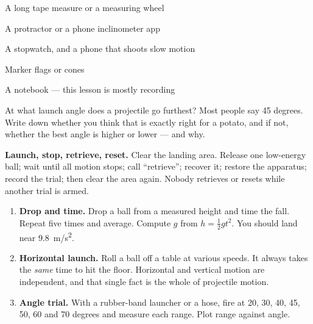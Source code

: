 



\begin{materials}
\item A long tape measure or a measuring wheel
\item A protractor or a phone inclinometer app
\item A stopwatch, and a phone that shoots slow motion
\item Marker flags or cones
\item A notebook --- this lesson is mostly recording
\end{materials}

\begin{predict}
At what launch angle does a projectile go furthest? Most people say 45 degrees.
Write down whether you think that is exactly right for a potato, and if not,
whether the best angle is higher or lower --- and why.
\end{predict}
\trajectoryplate

\begin{telosframe}
\textbf{Launch, stop, retrieve, reset.} Clear the landing area. Release one
low-energy ball; wait until all motion stops; call ``retrieve''; recover it;
restore the apparatus; record the trial; then clear the area again. Nobody
retrieves or resets while another trial is armed.
\end{telosframe}
\begin{enumerate}
\item \textbf{Drop and time.} Drop a ball from a measured height and time the fall. Repeat five times and average. Compute $g$ from $h = \tfrac{1}{2}gt^2$. You should land near \qty{9.8}{m/s^2}.
\item \textbf{Horizontal launch.} Roll a ball off a table at various speeds. It always takes the \emph{same} time to hit the floor. Horizontal and vertical motion are independent, and that single fact is the whole of projectile motion.
\item \textbf{Angle trial.} With a rubber-band launcher or a hose, fire at 20, 30, 40, 45, 50, 60 and 70 degrees and measure each range. Plot range against angle.
\end{enumerate}


